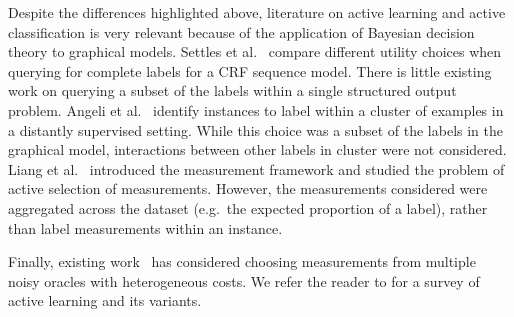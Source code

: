Despite the differences highlighted above, literature on active learning and active classification is very relevant because of the application of Bayesian decision theory to graphical models. 
Settles et al.~\cite{settles2008analysis} compare different utility choices when querying for complete labels for a CRF sequence model.
There is little existing work on querying a subset of the labels within a single structured output problem.
Angeli et al.~\cite{angeli2014combining} identify instances to label within a cluster of examples in a distantly supervised setting. While this choice was a subset of the labels in the graphical model, interactions between other labels in cluster were not considered.
Liang et al.~\cite{liang09measurements} introduced the measurement framework and studied the problem of active selection of measurements. However, the measurements considered were aggregated across the dataset (e.g.\ the expected proportion of a label), rather than label measurements within an instance.

Finally, existing work~\cite{donmez2008proactive,golovin2010near,yan2011active,vijayanarasimhan2014large} has considered choosing measurements from multiple noisy oracles with heterogeneous costs.
We refer the reader to \cite{settles2010active} for a survey of active learning and its variants.






%

